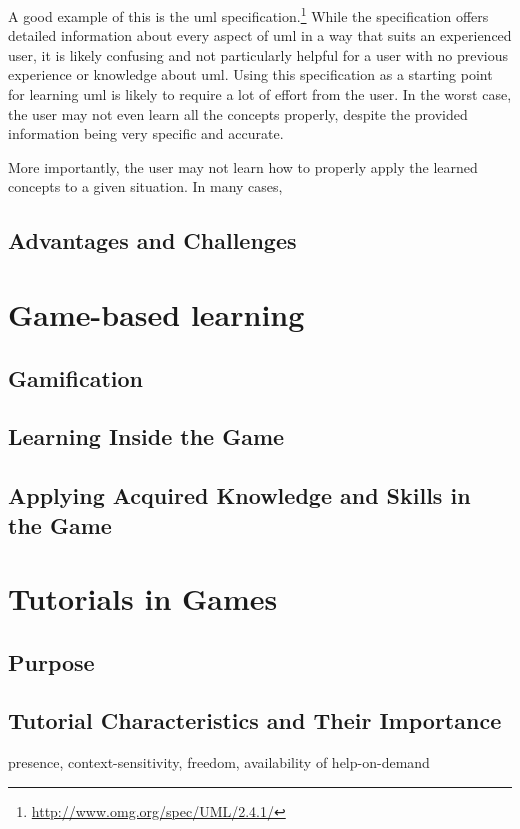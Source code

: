 \noindent
A good example of this is the \gls{uml} specification.\footnote{\url{http://www.omg.org/spec/UML/2.4.1/}} While the specification offers detailed information about every aspect of \gls{uml} in a way that suits an experienced user, it is likely confusing and not particularly helpful for a user with no previous experience or knowledge about \gls{uml}. Using this specification as a starting point for learning \gls{uml} is likely to require a lot of effort from the user. In the worst case, the user may not even learn all the concepts properly, despite the provided information being very specific and accurate.

\noindent
More importantly, the user may not learn how to properly apply the learned concepts to a given situation. In many cases, 


\subsection{Advantages and Challenges}




\section{Game-based learning}
\label{sec:game_based_learning}

\subsection{Gamification}


\subsection{Learning Inside the Game}


\subsection{Applying Acquired Knowledge and Skills in the Game}




\section{Tutorials in Games}
\label{sec:tutorials_in_games}


\subsection{Purpose}

\subsection{Tutorial Characteristics and Their Importance}

presence, context-sensitivity, freedom, availability of help-on-demand





